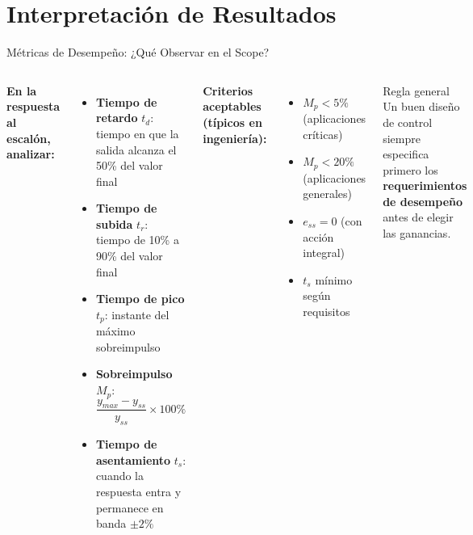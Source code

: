 \documentclass[aspectratio=169,xcolor=dvipsnames]{beamer}
\begin{document}
\section{Interpretación de Resultados}

\begin{frame}{Métricas de Desempeño: ¿Qué Observar en el Scope?}
    \footnotesize
    \begin{columns}
        \textbf{En la respuesta al escalón, analizar:}
        \begin{itemize}
            \item \textbf{Tiempo de retardo} $t_d$: tiempo en que la salida alcanza el 50\% del valor final
            \item \textbf{Tiempo de subida} $t_r$: tiempo de 10\% a 90\% del valor final
            \item \textbf{Tiempo de pico} $t_p$: instante del máximo sobreimpulso
            \item \textbf{Sobreimpulso} $M_p$: $\dfrac{y_{max} - y_{ss}}{y_{ss}} \times 100\%$
            \item \textbf{Tiempo de asentamiento} $t_s$: cuando la respuesta entra y permanece en banda $\pm 2\%$
        \end{itemize}
        \textbf{Criterios aceptables (típicos en ingeniería):}
        \begin{itemize}
            \item $M_p < 5\%$ (aplicaciones críticas)
            \item $M_p < 20\%$ (aplicaciones generales)
            \item $e_{ss} = 0$ (con acción integral)
            \item $t_s$ mínimo según requisitos
        \end{itemize}
        \vspace{0.3em}
        \begin{alertblock}{Regla general}
            Un buen diseño de control siempre especifica primero los \textbf{requerimientos de desempeño} antes de elegir las ganancias.
        \end{alertblock}
    \end{columns}
\end{frame}
\end{document}
